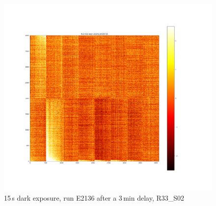 \begin{figure}[htbp]
\vspace{0.5cm}

\begin{minipage}{0.45\textwidth}
    \centering
    \includegraphics[width=\textwidth]{figures/E2136_dark15_delay_R33_S02.png}
    \caption{15\,s dark exposure, run E2136 after a 3\,min delay, R33\_S02}
    \label{fig:r33_s02_2136_delay}
\end{minipage}
\hfill
\begin{minipage}{0.45\textwidth}
    \centering
\end{minipage}
\end{figure}

%
%

